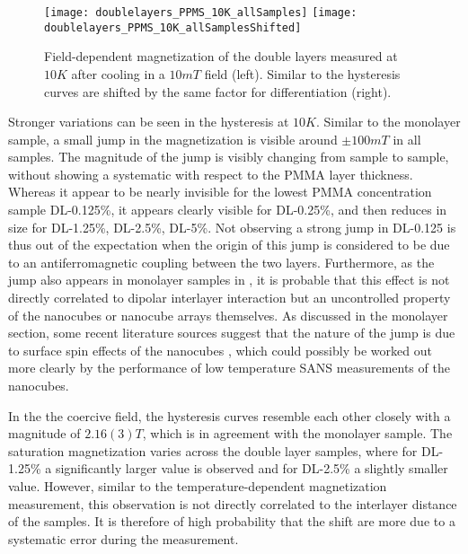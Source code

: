 \documentclass[\main/dresen_thesis.tex]{subfiles}
\begin{document}

    \begin{figure}[tb]
      \centering
      \texttt{[image: doublelayers\_PPMS\_10K\_allSamples]}
      \texttt{[image: doublelayers\_PPMS\_10K\_allSamplesShifted]}
      \caption{\label{fig:doubleLayers:10KVSM}Field-dependent magnetization of the double layers measured at $10 \unit{K}$ after cooling in a $10 \unit{mT}$ field (left). Similar to  the hysteresis curves are shifted by the same factor for differentiation (right).}
    \end{figure}
    Stronger variations can be seen in the hysteresis at $10 \unit{K}$.
    Similar to the monolayer sample, a small jump in the magnetization is visible around $\pm 100 \unit{mT}$ in all samples.
    The magnitude of the jump is visibly changing from sample to sample, without showing a systematic with respect to the PMMA layer thickness.
    Whereas it appear to be nearly invisible for the lowest PMMA concentration sample DL-0.125\%, it appears clearly visible for DL-0.25\%, and then reduces in size for DL-1.25\%, DL-2.5\%, DL-5\%.
    Not observing a strong jump in DL-0.125 is thus out of the expectation when the origin of this jump is considered to be due to an antiferromagnetic coupling between the two layers.
    Furthermore, as the jump also appears in monolayer samples in , it is probable that this effect is not directly correlated to dipolar interlayer interaction but an uncontrolled property of the nanocubes or nanocube arrays themselves.
    As discussed in the monolayer section, some recent literature sources suggest that the nature of the jump is due to surface spin effects of the nanocubes \cite{Xu_2015_Simul, Fu_2012_Uniqu}, which could possibly be worked out more clearly by the performance of low temperature SANS measurements of the nanocubes.

    In the the coercive field, the hysteresis curves resemble each other closely with a  magnitude of $2.16(3) \unit{T}$, which is in agreement with the monolayer sample.
    The saturation magnetization varies across the double layer samples, where for DL-1.25\% a significantly larger value is observed and for DL-2.5\% a slightly smaller value.
    However, similar to the temperature-dependent magnetization measurement, this observation is not directly correlated to the interlayer distance of the samples.
    It is therefore of high probability that the shift are more due to a systematic error during the measurement.
  \\
\end{document}
